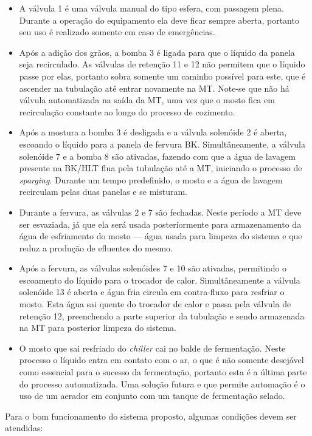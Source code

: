 \begin{itemize}
	\item A válvula 1 é uma válvula manual do tipo esfera, com passagem plena. Durante a operação do equipamento ela deve ficar sempre aberta, portanto seu uso é realizado somente em caso de emergências.
	\item Após a adição dos grãos, a bomba 3 é ligada para que o líquido da panela seja recirculado. As válvulas de retenção 11 e 12 não permitem que o líquido passe por elas, portanto sobra somente um caminho possível para este, que é ascender na tubulação até entrar novamente na MT. Note-se que não há válvula automatizada na saída da MT, uma vez que o mosto fica em recirculação constante ao longo do processo de cozimento.
	\item Após a mostura a bomba 3 é desligada e a válvula solenóide 2 é aberta, escoando o líquido para a panela de fervura BK. Simultâneamente, a válvula solenóide 7 e a bomba 8 são ativadas, fazendo com que a água de lavagem presente na BK/HLT flua pela tubulação até a MT, iniciando o processo de \textit{sparging}. Durante um tempo predefinido, o mosto e a água de lavagem recirculam pelas duas panelas e se misturam.
	\item Durante a fervura, as válvulas 2 e 7 são fechadas. Neste período a MT deve ser esvaziada, já que ela será usada posteriormente para armazenamento da água de esfriamento do mosto --- água usada para limpeza do sistema e que reduz a produção de efluentes do mesmo.
	\item Após a fervura, as válvulas solenóides 7 e 10 são ativadas, permitindo o escoamento do líquido para o trocador de calor. Simultâneamente a válvula solenóide 13 é aberta e água fria circula em contra-fluxo para resfriar o mosto. Esta água sai quente do trocador de calor e passa pela válvula de retenção 12, preenchendo a parte superior da tubulação e sendo armazenada na MT para posterior limpeza do sistema.
	\item O mosto que sai resfriado do \textit{chiller} cai no balde de fermentação. Neste processo o líquido entra em contato com o ar, o que é não somente desejável como essencial para o sucesso da fermentação, portanto esta é a última parte do processo automatizada. Uma solução futura e que permite automação é o uso de um aerador em conjunto com um tanque de fermentação selado.
\end{itemize}

Para o bom funcionamento do sistema proposto, algumas condições devem ser atendidas:

